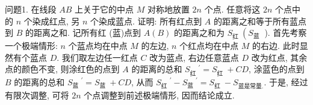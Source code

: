 
问题1. 在线段 $A B$ 上关于它的中点 $M$ 对称地放置 $2 n$ 个点.
任意将这 $2 n$ 个点中的 $n$ 个染成红点, 另 $n$ 个染成蓝点.
证明: 所有红点到 $A$ 的距离之和等于所有蓝点到 $B$ 的距离之和.
记所有红 (蓝)点到 $A(B)$ 的距离之和为 $S_{\text {红 }}\left(S_{\text {蓝 }}\right.$ ). 首先考察一个极端情形: $n$ 个蓝点均在中点 $M$ 的左边, $n$ 个红点均在中点 $M$ 的右边.
此时显然有个蓝点 $D$. 我们取左边任一红点 $C$ 改为蓝点, 右边任意蓝点 $D$ 改为红点, 其余点的颜色不变, 则涂红色的点到 $A$ 的距离的总和 $S_{\text {红 }}{ }^{\prime}=S_{\text {红 }}+C D$, 涂蓝色的点到 $B$ 的距离的总和 $S_{\text {蓝 }}{ }^{\prime}=S_{\text {蓝 }}+C D$, 从而 $S_{\text {红 }}{ }^{\prime}-S_{\text {蓝 }}{ }^{\prime}=S_{\text {红 }}-S_{\text {蓝是常量.
}}$. 于是, 经过有限次调整, 可将 $2 n$ 个点调整到前述极端情形, 因而结论成立.



